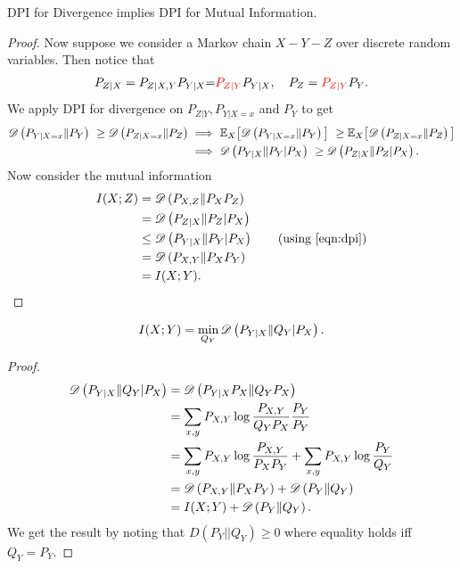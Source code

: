 \documentclass[11pt,a4paper]{article}
\begin{document}
\begin{theorem}
    DPI for Divergence implies DPI for Mutual Information.
\end{theorem}

\begin{proof}
    Now suppose we consider a Markov chain $X - Y - Z$ over discrete random variables. Then notice that 
    \begin{align*}
        P_{Z|X} = P_{Z|X,Y} P_{Y|X} {=} \textcolor{red}{P_{Z|Y}} P_{Y|X}, \quad P_Z = \textcolor{red}{P_{Z|Y}} P_Y.
    \end{align*}
    We apply DPI for divergence on $P_{Z|Y}, P_{Y|X=x}$ and $P_{Y}$ to get
    \begin{align}
        \mathscr{D} \left(P_{Y|X = x}\|P_{Y}\right)\ \ge \mathscr{D} \left(P_{Z|X = x}\|P_{Z}\right) \implies &\ \mathbb{E}_X \big[\mathscr{D} \left(P_{Y|X = x}\|P_{Y}\right)\big]\ \ge \mathbb{E}_X\big[\mathscr{D} \left(P_{Z|X = x}\| P_{Z}\right)\big] \nonumber \\
        \implies &\ \mathscr{D} \left(P_{Y|X}\|P_{Y} | P_X\right)\ \ge \mathscr{D} \left(P_{Z|X}\| P_{Z} | P_X\right).\label{eqn:dpi}
    \end{align}
    Now consider the mutual information
    \begin{align*}
        I(X;Z) &= \divergence{P_{X,Z}}{P_X P_Z} \\
        &= \divergence{P_{Z|X}}{P_Z | P_X} \\
        &\le \divergence{P_{Y|X}}{P_Y | P_X} \tag{using \eqref{eqn:dpi}} \\
        &= \divergence{P_{X,Y}}{P_X P_Y} \\
        &= I(X; Y).
    \end{align*}
\end{proof}

\begin{theorem}
    \begin{align*}
        I(X;Y) = \min_{Q_{Y}} \mathscr{D} \left(P_{Y|X}\|Q_{Y}|P_{X}\right).
    \end{align*}
\end{theorem}

\begin{proof}
    \begin{align*}
        \mathscr{D} \left(P_{Y|X}\|Q_{Y}|P_{X}\right) &= \mathscr{D} \left(P_{Y|X}P_{X}\|Q_{Y}P_{X}\right) \\ 
        &= \sum_{x,y} P_{X,Y} \log{\frac{P_{X,Y}}{Q_{Y}P_{X}} \frac{P_{Y}}{P_{Y}}} \\ 
        &= \sum_{x,y} P_{X,Y} \log{\frac{P_{X,Y}}{P_{X}P_{Y}} + \sum_{x,y} P_{X,Y} \log{\frac{P_{Y}}{Q_{Y}}}} \\ 
        &= \mathscr{D} \left(P_{X,Y}\|P_X P_Y\right) + \mathscr{D} \left(P_{Y}\|Q_Y\right) \\ 
        &= I(X;Y) + \mathscr{D} \left(P_{Y}\|Q_Y\right).
    \end{align*}
    We get the result by noting that $D(P_{Y}||Q_{Y}) \ge 0$ where equality holds iff $Q_{Y} = P_{Y}.$        
\end{proof}
\end{document}
